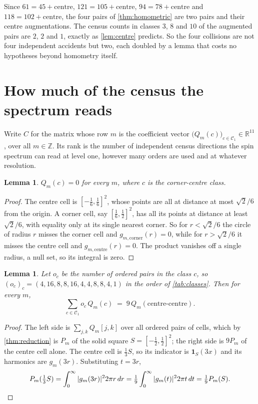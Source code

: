 \documentclass[11pt]{amsart}
\newtheorem{lemma}[theorem]{Lemma}
\theoremstyle{definition}
\theoremstyle{remark}
\begin{document}
Since $61 = 45 + \text{centre}$, $121 = 105 + \text{centre}$, $94 = 78 + \text{centre}$ and $118 = 102 + \text{centre}$, the four pairs of \cref{thm:homometric} are two pairs and their centre augmentations. The census counts in classes $3$, $8$ and $10$ of the augmented pairs are $2$, $2$ and $1$, exactly as \cref{lem:centre} predicts. So the four collisions are not four independent accidents but two, each doubled by a lemma that costs no hypotheses beyond homometry itself.

\section{How much of the census the spectrum reads}
\label{sec:rank}

Write $C$ for the matrix whose row $m$ is the coefficient vector $\bigl(Q_m(c)\bigr)_{c \in \mathcal C_1} \in \mathbb R^{11}$, over all $m \in \mathbb Z$. Its rank is the number of independent census directions the spin spectrum can read at level one, however many orders are used and at whatever resolution.

\begin{lemma}
\label{lem:disjoint}
$Q_m(c) = 0$ for every $m$, where $c$ is the corner-centre class.
\end{lemma}

\begin{proof}
The centre cell is $[-\tfrac16,\tfrac16]^2$, whose points are all at distance at most $\sqrt2/6$ from the origin. A corner cell, say $[\tfrac16,\tfrac12]^2$, has all its points at distance at least $\sqrt2/6$, with equality only at its single nearest corner. So for $r < \sqrt2/6$ the circle of radius $r$ misses the corner cell and $g_{m,\text{corner}}(r) = 0$, while for $r > \sqrt2/6$ it misses the centre cell and $g_{m,\text{centre}}(r) = 0$. The product vanishes off a single radius, a null set, so its integral is zero.
\end{proof}

\begin{lemma}
\label{lem:similar}
Let $o_c$ be the number of ordered pairs in the class $c$, so $(o_c)_c = (4,16,8,8,16,4,4,8,8,4,1)$ in the order of \cref{tab:classes}. Then for every $m$,
\[
\sum_{c \in \mathcal C_1} o_c \, Q_m(c) \;=\; 9\, Q_m(\text{centre-centre}) .
\]
\end{lemma}

\begin{proof}
The left side is $\sum_{j,k} Q_m[j,k]$ over all ordered pairs of cells, which by \cref{thm:reduction} is $P_m$ of the solid square $S = [-\tfrac12,\tfrac12]^2$; the right side is $9 P_m$ of the centre cell alone. The centre cell is $\tfrac13 S$, so its indicator is $\mathbf 1_S(3x)$ and its harmonics are $g_m(3r)$. Substituting $t = 3r$,
\[
P_m(\tfrac13 S) = \int_0^\infty |g_m(3r)|^2 2\pi r\, dr = \tfrac19 \int_0^\infty |g_m(t)|^2 2\pi t \, dt = \tfrac19 P_m(S) . \qedhere
\]
\end{proof}
\end{document}

